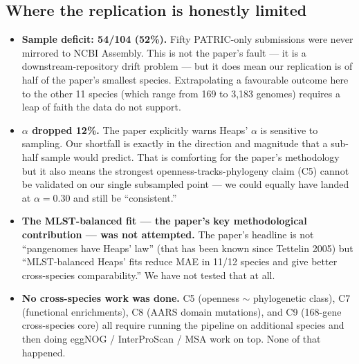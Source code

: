 \documentclass[11pt,a4paper]{article}
\begin{document}
\subsection{Where the replication is honestly limited}
\begin{itemize}
  \item \textbf{Sample deficit: 54/104 (52\%).} Fifty PATRIC-only submissions were never mirrored to NCBI Assembly. This is not the paper's fault --- it is a downstream-repository drift problem --- but it does mean our replication is of half of the paper's smallest species. Extrapolating a favourable outcome here to the other 11 species (which range from 169 to 3{,}183 genomes) requires a leap of faith the data do not support.
  \item \textbf{$\alpha$ dropped 12\%.} The paper explicitly warns Heaps' $\alpha$ is sensitive to sampling. Our shortfall is exactly in the direction and magnitude that a sub-half sample would predict. That is comforting for the paper's methodology but it also means the strongest openness-tracks-phylogeny claim (C5) cannot be validated on our single subsampled point --- we could equally have landed at $\alpha = 0.30$ and still be ``consistent.''
  \item \textbf{The MLST-balanced fit --- the paper's key methodological contribution --- was not attempted.} The paper's headline is not ``pangenomes have Heaps' law'' (that has been known since Tettelin 2005) but ``MLST-balanced Heaps' fits reduce MAE in 11/12 species and give better cross-species comparability.'' We have not tested that at all.
  \item \textbf{No cross-species work was done.} C5 (openness $\sim$ phylogenetic class), C7 (functional enrichments), C8 (AARS domain mutations), and C9 (168-gene cross-species core) all require running the pipeline on additional species and then doing eggNOG / InterProScan / MSA work on top. None of that happened.
\end{itemize}
\end{document}
